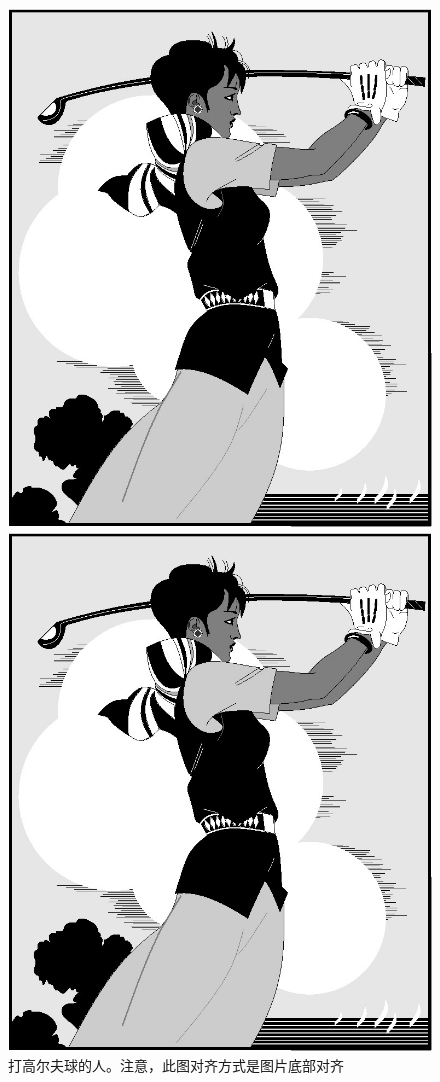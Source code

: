 \begin{figure}[htbp]
  \centering
  \begin{minipage}[t]{0.4\textwidth}
    \centering
    \includegraphics[width=\textwidth,height=\textwidth]{golfer}
    \caption{打高尔夫球的人。注意，此图对齐方式是图片底部对齐}
    \label{golfer9}
  \end{minipage}
  \centering
  \begin{minipage}[t]{0.4\textwidth}
    \centering
    \includegraphics[width=\textwidth]{golfer}

\end{minipage}
\end{figure}
